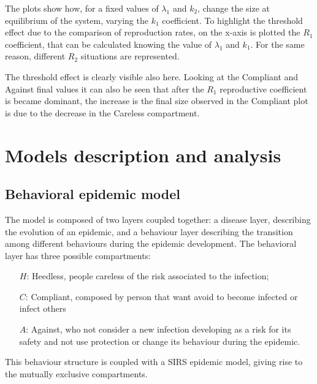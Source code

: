 The plots show how, for a fixed values of $\lambda_1$ and $k_2$, change the size at equilibrium of the system, varying the $k_1$ coefficient. To highlight the threshold effect due to the comparison of reproduction rates, on the x-axis is plotted the $R_1$  coefficient, that can be calculated knowing the value of  $\lambda_1$ and $k_1$. For the same reason, different $R_2$ situations are represented. 

The threshold effect is clearly visible also here. Looking at the Compliant and Against final values it can also be seen that after the $R_1$ reproductive coefficient is became dominant, the  increase is the final size observed in the Compliant plot is due to the decrease in the Careless compartment. 





\chapter{Models description and analysis}
\label{ch:epi_behav_model}
\section{Behavioral epidemic model}

The model is composed of two layers coupled together: a disease layer, describing the evolution of an epidemic, and a behaviour layer describing the transition among different behaviours during the epidemic development.
The behavioral layer has three possible compartments: 

\begin{itemize}
	\item[$H$:] Heedless, people careless of the risk associated to the infection;
	\item[$C$:] Compliant, composed by person that want avoid to become infected or infect others
	\item[$A$:] Against, who not consider a new infection developing as a risk for its safety and not use protection or change its behaviour during the epidemic. 
\end{itemize}

This behaviour structure is coupled with a SIRS epidemic model, giving rise to the mutually exclusive compartments.

